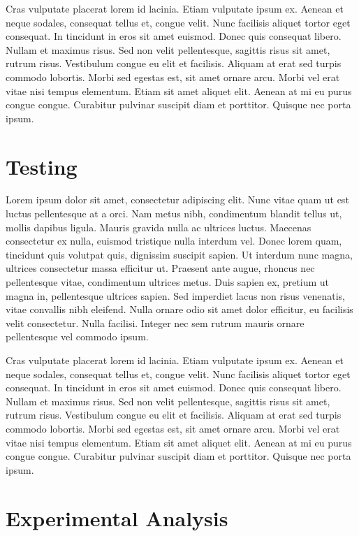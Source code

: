 \documentclass[11pt]{scrreprt}
\begin{document}
Cras vulputate placerat lorem id lacinia. Etiam vulputate ipsum ex. Aenean et neque sodales, consequat tellus et, congue velit. Nunc facilisis aliquet tortor eget consequat. In tincidunt in eros sit amet euismod. Donec quis consequat libero. Nullam et maximus risus. Sed non velit pellentesque, sagittis risus sit amet, rutrum risus. Vestibulum congue eu elit et facilisis. Aliquam at erat sed turpis commodo lobortis. Morbi sed egestas est, sit amet ornare arcu. Morbi vel erat vitae nisi tempus elementum. Etiam sit amet aliquet elit. Aenean at mi eu purus congue congue. Curabitur pulvinar suscipit diam et porttitor. Quisque nec porta ipsum. 


\chapter{Testing}

Lorem ipsum dolor sit amet, consectetur adipiscing elit. Nunc vitae quam ut est luctus pellentesque at a orci. Nam metus nibh, condimentum blandit tellus ut, mollis dapibus ligula. Mauris gravida nulla ac ultrices luctus. Maecenas consectetur ex nulla, euismod tristique nulla interdum vel. Donec lorem quam, tincidunt quis volutpat quis, dignissim suscipit sapien. Ut interdum nunc magna, ultrices consectetur massa efficitur ut. Praesent ante augue, rhoncus nec pellentesque vitae, condimentum ultrices metus. Duis sapien ex, pretium ut magna in, pellentesque ultrices sapien. Sed imperdiet lacus non risus venenatis, vitae convallis nibh eleifend. Nulla ornare odio sit amet dolor efficitur, eu facilisis velit consectetur. Nulla facilisi. Integer nec sem rutrum mauris ornare pellentesque vel commodo ipsum.

Cras vulputate placerat lorem id lacinia. Etiam vulputate ipsum ex. Aenean et neque sodales, consequat tellus et, congue velit. Nunc facilisis aliquet tortor eget consequat. In tincidunt in eros sit amet euismod. Donec quis consequat libero. Nullam et maximus risus. Sed non velit pellentesque, sagittis risus sit amet, rutrum risus. Vestibulum congue eu elit et facilisis. Aliquam at erat sed turpis commodo lobortis. Morbi sed egestas est, sit amet ornare arcu. Morbi vel erat vitae nisi tempus elementum. Etiam sit amet aliquet elit. Aenean at mi eu purus congue congue. Curabitur pulvinar suscipit diam et porttitor. Quisque nec porta ipsum. 


\chapter{Experimental Analysis}
\end{document}
